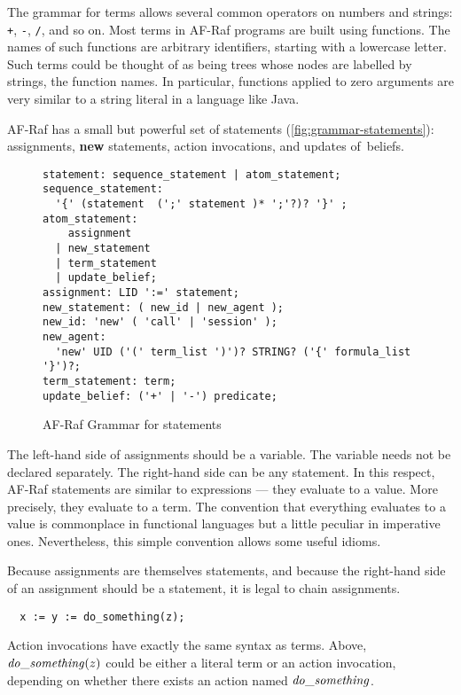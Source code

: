 \documentclass[a4paper,12pt,oneside,fleqn]{book} %
\begin{document}
The grammar for terms allows several common operators on numbers and
strings: \verb-+-, \verb+-+, \verb+/+, and so on. Most terms in AF-Raf
programs are built using functions. The names of such functions are
arbitrary identifiers, starting with a lowercase letter. Such terms could
be thought of as being trees whose nodes are labelled by strings, the
function names. In particular, functions applied to zero arguments are very
similar to a string literal in a language like Java.

AF-Raf has a small but powerful set of statements
(\autoref{fig:grammar-statements}): assignments, {\bf new} statements,
action invocations, and updates of~beliefs.

\begin{figure}\footnotesize %
\begin{verbatim}
statement: sequence_statement | atom_statement;
sequence_statement:
  '{' (statement  (';' statement )* ';'?)? '}' ;
atom_statement:
    assignment
  | new_statement
  | term_statement
  | update_belief;
assignment: LID ':=' statement;
new_statement: ( new_id | new_agent );
new_id: 'new' ( 'call' | 'session' );
new_agent:
  'new' UID ('(' term_list ')')? STRING? ('{' formula_list '}')?;
term_statement: term;
update_belief: ('+' | '-') predicate;
\end{verbatim}
\caption{AF-Raf Grammar for statements}
\label{fig:grammar-statements}
\end{figure} %

The left-hand side of assignments should be a variable. The variable needs
not be declared separately.  The right-hand side can be any statement.  In
this respect, AF-Raf statements are similar to expressions --- they
evaluate to a value. More precisely, they evaluate to a term. The
convention that everything evaluates to a value is commonplace in
functional languages but a little peculiar in imperative ones.
Nevertheless, this simple convention allows some useful idioms.

\begin{example}
Because assignments are themselves statements, and because the right-hand
side of an assignment should be a statement, it is legal to chain
assignments.
\begin{verbatim}
  x := y := do_something(z);
\end{verbatim}
Action invocations have exactly the same syntax as terms. Above, ${\it
do\_something}(z)$ could be either a literal term or an action invocation,
depending on whether there exists an action named ${\it do\_something}$.
\end{example}
\end{document}
